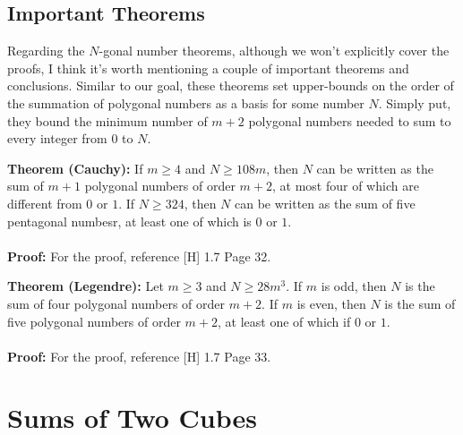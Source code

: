 \subsection{Important Theorems}
Regarding the $N$-gonal number theorems, although we won't explicitly cover the proofs, I think it's worth mentioning a couple of important theorems and conclusions. Similar to our goal, these theorems set upper-bounds on the order of the summation of polygonal numbers as a basis for some number $N$. Simply put, they bound the minimum number of $m+2$ polygonal numbers needed to sum to every integer from $0$ to $N$. 
\begin{boxedsection}
    \textbf{Theorem (Cauchy):} If $m \geq 4$ and $N \geq 108m$, then $N$ can be written as the sum of $m+1$ polygonal numbers of order $m+2$, at most four of which are different from $0$ or $1$. If $N \geq 324$, then $N$ can be written as the sum of five pentagonal numbesr, at least one of which is $0$ or $1$. \\
    \\
    \textbf{Proof:} For the proof, reference [H] 1.7 Page 32.
\end{boxedsection}
\begin{boxedsection}
    \textbf{Theorem (Legendre):} Let $m \geq 3$ and $N \geq 28m^3$. If $m$ is odd, then $N$ is the sum of four polygonal numbers of order $m+2$. If $m$ is even, then $N$ is the sum of five polygonal numbers of order $m+2$, at least one of which if $0$ or $1$. \\
    \\
    \textbf{Proof:} For the proof, reference [H] 1.7 Page 33.
\end{boxedsection}

\pagebreak
\section{Sums of Two Cubes}
